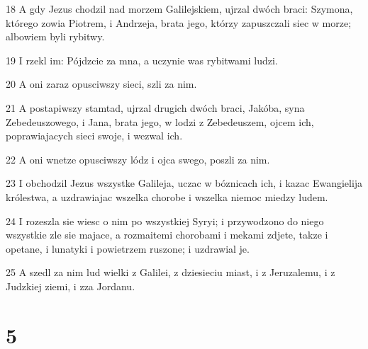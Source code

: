 \par 18 A gdy Jezus chodzil nad morzem Galilejskiem, ujrzal dwóch braci: Szymona, którego zowia Piotrem, i Andrzeja, brata jego, którzy zapuszczali siec w morze; albowiem byli rybitwy.
\par 19 I rzekl im: Pójdzcie za mna, a uczynie was rybitwami ludzi.
\par 20 A oni zaraz opusciwszy sieci, szli za nim.
\par 21 A postapiwszy stamtad, ujrzal drugich dwóch braci, Jakóba, syna Zebedeuszowego, i Jana, brata jego, w lodzi z Zebedeuszem, ojcem ich, poprawiajacych sieci swoje, i wezwal ich.
\par 22 A oni wnetze opusciwszy lódz i ojca swego, poszli za nim.
\par 23 I obchodzil Jezus wszystke Galileja, uczac w bóznicach ich, i kazac Ewangielija królestwa, a uzdrawiajac wszelka chorobe i wszelka niemoc miedzy ludem.
\par 24 I rozeszla sie wiesc o nim po wszystkiej Syryi; i przywodzono do niego wszystkie zle sie majace, a rozmaitemi chorobami i mekami zdjete, takze i opetane, i lunatyki i powietrzem ruszone; i uzdrawial je.
\par 25 A szedl za nim lud wielki z Galilei, z dziesieciu miast, i z Jeruzalemu, i z Judzkiej ziemi, i zza Jordanu.

\chapter{5}

